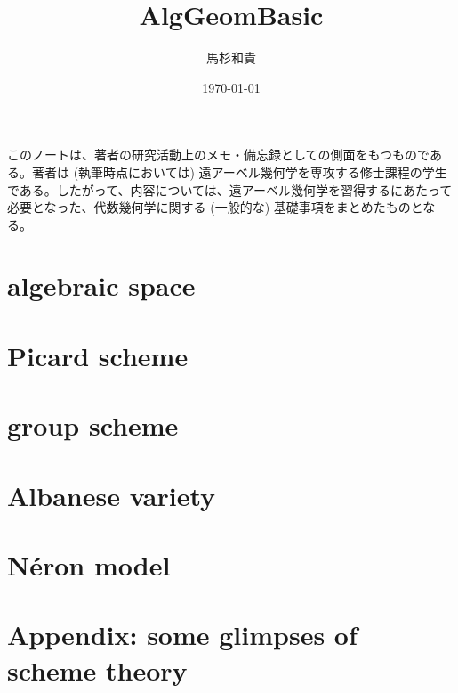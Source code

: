 \documentclass{jsarticle}
\title{AlgGeomBasic}
\author{馬杉和貴}
\date{\today}
\begin{document}
\maketitle

このノートは、著者の研究活動上のメモ・備忘録としての側面をもつものである。著者は (執筆時点においては) 遠アーベル幾何学を専攻する修士課程の学生である。したがって、内容については、遠アーベル幾何学を習得するにあたって必要となった、代数幾何学に関する (一般的な) 基礎事項をまとめたものとなる。

\tableofcontents

\section{algebraic space}

\newpage
\section{Picard scheme}



\newpage
\section{group scheme}

\section{Albanese variety}

\section{N\'{e}ron model}

\newpage
\section{Appendix: some glimpses of scheme theory}

\end{document}
